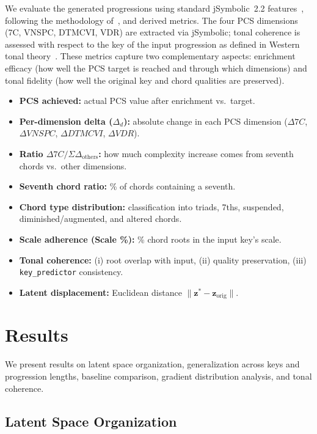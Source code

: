 \documentclass[conference]{IEEEtran}
\begin{document}
We evaluate the generated progressions using standard jSymbolic~2.2 features~\cite{mckay2018jsymbolic}, following the methodology of~\cite{uemura2022morphing}, and derived metrics. The four PCS dimensions (7C, VNSPC, DTMCVI, VDR) are extracted via jSymbolic; tonal coherence is assessed with respect to the key of the input progression as defined in Western tonal theory~\cite{temperley2004cognition}. These metrics capture two complementary aspects: enrichment efficacy (how well the PCS target is reached and through which dimensions) and tonal fidelity (how well the original key and chord qualities are preserved).
\begin{itemize}
    \item \textbf{PCS achieved:} actual PCS value after enrichment vs.\ target.
    \item \textbf{Per-dimension delta ($\Delta_d$):} absolute change in each PCS dimension ($\Delta 7C$, $\Delta VNSPC$, $\Delta DTMCVI$, $\Delta VDR$).
    \item \textbf{Ratio $\Delta 7C / \Sigma\Delta_{\text{others}}$:} how much complexity increase comes from seventh chords vs.\ other dimensions.
    \item \textbf{Seventh chord ratio:} \% of chords containing a seventh.
    \item \textbf{Chord type distribution:} classification into triads, 7ths, suspended, diminished/augmented, and altered chords.
    \item \textbf{Scale adherence (Scale \%):} \% chord roots in the input key's scale.
    \item \textbf{Tonal coherence:} (i) root overlap with input, (ii) quality preservation, (iii) \texttt{key\_predictor} consistency.
    \item \textbf{Latent displacement:} Euclidean distance $\|\mathbf{z}^* - \mathbf{z}_{\text{orig}}\|$.
\end{itemize}

\section{Results}

We present results on latent space organization, generalization across keys and progression lengths, baseline comparison, gradient distribution analysis, and tonal coherence.

\subsection{Latent Space Organization}
\end{document}

